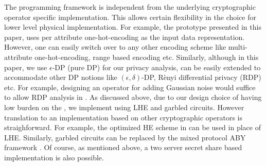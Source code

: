  The programming framework is independent from the underlying cryptographic operator specific implementation. This allows certain flexibility in the choice for lower level physical implementation. 
 For example, the prototype \system presented in this paper, uses per attribute one-hot-encoding as the input data representation. However, one can easily switch over to any other encoding scheme like multi-attribute one-hot-encoding, range based encoding etc. %
 Similarly, although in this paper, we use $\epsilon$-DP (pure DP) for our privacy analysis, \system can be easily extended to accommodate other DP notions like $(\epsilon,\delta)$-DP, R\`enyi differential privacy (RDP) \cite{RDP} etc. For example, designing an operator for adding Gaussian noise would suffice to allow RDP analysis in \system. As discussed above, due to our design choice of having low burden on the \CSP, we implement \system using LHE and garbled circuits. However translation to an implementation based on other cryptographic operators is straighforward. For example, the optimized HE scheme in \cite{Blatt2019OptimizedHE} can be used in place of LHE. Similarly, garbled circuits can be replaced by the mixed protocol ABY framework \cite{Demmler2015ABYA}. Of course, as mentioned above, a two server secret share based implementation is also possible. 


